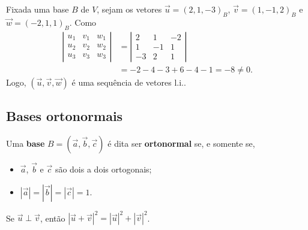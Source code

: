 \begin{ex}
  Fixada uma base $B$ de $V$, sejam os vetores $\vec{u} = (2,1,-3)_B$, $\vec{v} = (1,-1,2)_B$ e $\vec{w} = (-2,1,1)_B$. Como
  \begin{align}
    \left|\begin{array}{ccc}
            u_1 & v_1 & w_1\\
            u_2 & v_2 & w_2\\
            u_3 & v_3 & w_3
          \end{array}\right| &=
                               \left|\begin{array}{ccc}
                                       2 & 1 & -2\\
                                       1 & -1 & 1\\
                                       -3 & 2 & 1
                                     \end{array}\right| \\
    &= -2-4-3+6-4-1 = -8\neq 0.
  \end{align}
  Logo, $(\vec{u}, \vec{v}, \vec{w})$ é uma sequência de vetores l.i..
\end{ex}

\subsection{Bases ortonormais}

Uma {\bf base} $B = (\vec{a}, \vec{b}, \vec{c})$ é dita ser {\bf ortonormal} se, e somente se,
\begin{itemize}
\item $\vec{a}$, $\vec{b}$ e $\vec{c}$ são dois a dois ortogonais;
\item $|\vec{a}|=|\vec{b}|=|\vec{c}|=1$.
\end{itemize}

\begin{obs}\label{obs:pitagoras}
  Se $\vec{u}\perp\vec{v}$, então $|\vec{u}+\vec{v}|^2=|\vec{u}|^2+|\vec{v}|^2$.
\end{obs}

